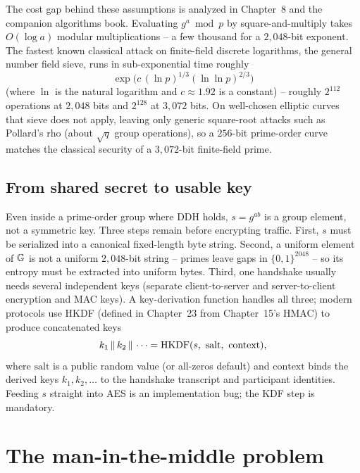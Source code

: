 \begin{connectionbox}
The cost gap behind these assumptions is analyzed in Chapter~8 and the companion algorithms book. Evaluating $g^a \bmod p$ by square-and-multiply takes $O(\log a)$ modular multiplications -- a few thousand for a $2{,}048$-bit exponent. The fastest known classical attack on finite-field discrete logarithms, the general number field sieve, runs in sub-exponential time roughly
\[
  \exp\!\bigl(c\,(\ln p)^{1/3}(\ln \ln p)^{2/3}\bigr)
\]
(where $\ln$ is the natural logarithm and $c \approx 1.92$ is a constant) -- roughly $2^{112}$ operations at $2{,}048$ bits and $2^{128}$ at $3{,}072$ bits. On well-chosen elliptic curves that sieve does not apply, leaving only generic square-root attacks such as Pollard's rho (about $\sqrt{q}$ group operations), so a $256$-bit prime-order curve matches the classical security of a $3{,}072$-bit finite-field prime.
\end{connectionbox}

\subsection{From shared secret to usable key}
\label{ch18:kdf}

Even inside a prime-order group where DDH holds, $s = g^{ab}$ is a group element, not a symmetric key. Three steps remain before encrypting traffic. First, $s$ must be serialized into a canonical fixed-length byte string. Second, a uniform element of $\mathbb{G}$ is not a uniform $2{,}048$-bit string -- primes leave gaps in $\{0,1\}^{2048}$ -- so its entropy must be extracted into uniform bytes. Third, one handshake usually needs several independent keys (separate client-to-server and server-to-client encryption and MAC keys). A key-derivation function handles all three; modern protocols use HKDF (defined in Chapter~23 from Chapter~15's HMAC) to produce concatenated keys
\[
  k_1 \,\|\, k_2 \,\|\, \cdots = \operatorname{HKDF}(s,\ \text{salt},\ \text{context}),
\]
where $\text{salt}$ is a public random value (or all-zeros default) and $\text{context}$ binds the derived keys $k_1, k_2, \dots$ to the handshake transcript and participant identities. Feeding $s$ straight into AES is an implementation bug; the KDF step is mandatory.

\section{The man-in-the-middle problem}
\label{ch18:mitm}

